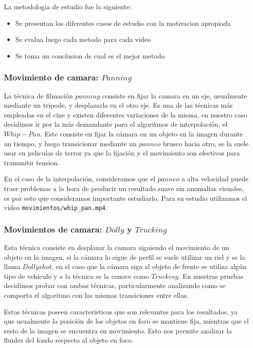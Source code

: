 La metodologia de estudio fue la siguiente:

\begin{itemize}
	\item{Se presentan los diferentes casos de estudio con la motivacion apropiada}
	\item{Se evalua luego cada metodo para cada video}
	\item{Se toma un conclusion de cual es el mejor metodo}
\end{itemize}

\subsubsection{Movimiento de camara: $Panning$}

La técnica de filmación $panning$ consiste en fijar la camara en un eje, usualmente mediante un tripode, y desplazarla en el otro eje. Es una de las técnicas más empleadas en el cine y existen diferentes variaciones de la misma, en nuestro caso decidimos ir por la más demandante para el algoritmos de interpolación, el $Whip-Pan$. Este consiste en fijar la cámara en un objeto en la imagen durante un tiempo, y luego transicionar mediante un $panneo$ brusco hacia otro, se la suele usar en peliculas de terror ya que la fijación y el movimiento son efectivos para transmitir tension.

En el caso de la interpolación, consideramos que el $panneo$ a alta velocidad puede traer problemas a la hora de producir un resultado suave sin anomalias visuales, es por esto que consideramos importante estudiarlo. Para su estudio utilizamos el video \texttt{movimientos/whip\_pan.mp4}.

\subsubsection{Movimientos de camara: $Dolly$ y $Trucking$}

Esta técnica consiste en desplazar la camara siguiendo el movimiento de un objeto en la imagen, si la cámara lo sigue de perfil se suele utilizar un riel y se la llama $Dolly shot$, en el caso que la cámara siga al objeto de frente se utiliza algún tipo de vehiculo y a la técnica se la conoce como $Trucking$. En nuestras pruebas decidimos probar con ambas técnicas, particularmente analizando como se comporta el algoritmo con las mismas transiciones entre ellas.

Estas técnicas poseen caracteristicas que son relevantes para los resultados, ya que usualmente la posición de los objetos en foco se mantiene fija, mientras que el resto de la imagen se encuentra en movimiento. Esto nos permite analizar la fluidez del fondo respecto al objeto en foco. 

